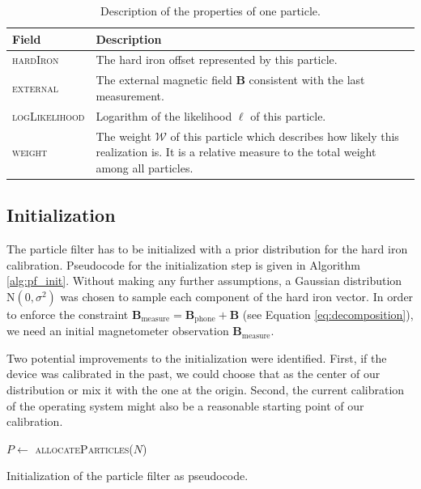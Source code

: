 \begin{table}[h]
    \centering
    \begin{tabular}{ | l | p{10cm} | }
    \hline
    \textbf{Field}             & \textbf{Description} \\ \hline
    \textsc{hardIron}          & The hard iron offset represented by this particle. \\ \hline
    \textsc{external}          & The external magnetic field $\bm{B}$ consistent with the last measurement. \\ \hline
    \textsc{logLikelihood}     & Logarithm of the likelihood $\ell$ of this particle. \\ \hline
    \textsc{weight}            & The weight $\mathcal{W}$ of this particle which describes how likely this realization is. It is a relative measure to the total weight among all particles. \\ \hline
    \end{tabular}
    \caption{Description of the properties of one particle.}
    \label{tbl:one_particle}
\end{table}

\subsection{Initialization}

The particle filter has to be initialized with a prior distribution for the hard iron calibration. Pseudocode for the initialization step is given in Algorithm \ref{alg:pf_init}. Without making any further assumptions, a Gaussian distribution $\text{N}(0, \sigma^2)$ was chosen to sample each component of the hard iron vector. In order to enforce the constraint $\bm{B}_\text{measure} = \bm{B}_\text{phone} + \bm{B}$ (see Equation \ref{eq:decomposition}), we need an initial magnetometer observation $\bm{B}_\text{measure}$.

Two potential improvements to the initialization were identified. First, if the device was calibrated in the past, we could choose that as the center of our distribution or mix it with the one at the origin. Second, the current calibration of the operating system might also be a reasonable starting point of our calibration.

\begin{algorithm}[h]
	$P \leftarrow$ \textsc{allocateParticles}($N$)\\
	\caption{Initialization of the particle filter as pseudocode.}
	\label{alg:pf_init}
\end{algorithm}


